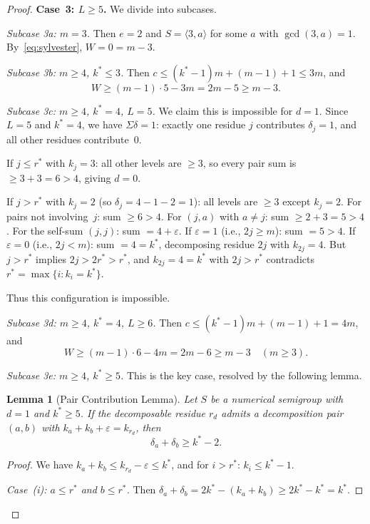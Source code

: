 \documentclass[11pt]{amsart}
\newtheorem{lemma}[theorem]{Lemma}
\theoremstyle{definition}
\theoremstyle{remark}
\begin{document}
\begin{proof}
\medskip
\noindent\textbf{Case~3: $L \ge 5$.}
We divide into subcases.

\smallskip
\textit{Subcase 3a: $m = 3$.}
Then $e = 2$ and $S = \langle 3, a \rangle$ for some $a$ with $\gcd(3, a) = 1$.
By~\eqref{eq:sylvester}, $W = 0 = m - 3$.

\smallskip
\textit{Subcase 3b: $m \ge 4$, $k^* \le 3$.}
Then $c \le (k^* - 1)m + (m - 1) + 1 \le 3m$, and
\[
  W \ge (m - 1) \cdot 5 - 3m = 2m - 5 \ge m - 3.
\]

\smallskip
\textit{Subcase 3c: $m \ge 4$, $k^* = 4$, $L = 5$.}
We claim this is impossible for $d = 1$.
Since $L = 5$ and $k^* = 4$, we have $\Sigma\delta = 1$:
exactly one residue $j$ contributes $\delta_j = 1$, and all other residues
contribute~$0$.

If $j \le r^*$ with $k_j = 3$: all other levels are $\ge 3$, so every
pair sum is $\ge 3 + 3 = 6 > 4$, giving $d = 0$.

If $j > r^*$ with $k_j = 2$ (so $\delta_j = 4 - 1 - 2 = 1$):
all levels are $\ge 3$ except $k_j = 2$.
For pairs not involving~$j$: sum $\ge 6 > 4$.
For $(j, a)$ with $a \neq j$: sum $\ge 2 + 3 = 5 > 4$.
For the self-sum $(j, j)$: sum $= 4 + \varepsilon$.
If $\varepsilon = 1$ (i.e., $2j \ge m$): sum $= 5 > 4$.
If $\varepsilon = 0$ (i.e., $2j < m$): sum $= 4 = k^*$, decomposing residue $2j$
with $k_{2j} = 4$.  But $j > r^*$ implies $2j > 2r^* > r^*$,
and $k_{2j} = 4 = k^*$ with $2j > r^*$ contradicts $r^* = \max\{i: k_i = k^*\}$.

Thus this configuration is impossible.

\smallskip
\textit{Subcase 3d: $m \ge 4$, $k^* = 4$, $L \ge 6$.}
Then $c \le (k^* - 1)m + (m-1) + 1 = 4m$, and
\[
  W \ge (m - 1) \cdot 6 - 4m = 2m - 6 \ge m - 3 \quad (m \ge 3).
\]

\smallskip
\textit{Subcase 3e: $m \ge 4$, $k^* \ge 5$.}
This is the key case, resolved by the following lemma.

\begin{lemma}[Pair Contribution Lemma]\label{lem:pair}
Let $S$ be a numerical semigroup with $d = 1$ and $k^* \ge 5$.
If the decomposable residue $r_d$ admits a decomposition pair $(a, b)$
with $k_a + k_b + \varepsilon = k_{r_d}$, then
\[
  \delta_a + \delta_b \ge k^* - 2.
\]
\end{lemma}

\begin{proof}
We have $k_a + k_b \le k_{r_d} - \varepsilon \le k^*$, and for $i > r^*$:
$k_i \le k^* - 1$.

\emph{Case~(i): $a \le r^*$ and $b \le r^*$.}
Then $\delta_a + \delta_b = 2k^* - (k_a + k_b) \ge 2k^* - k^* = k^*$.


\end{proof}
\end{proof}
\end{document}
